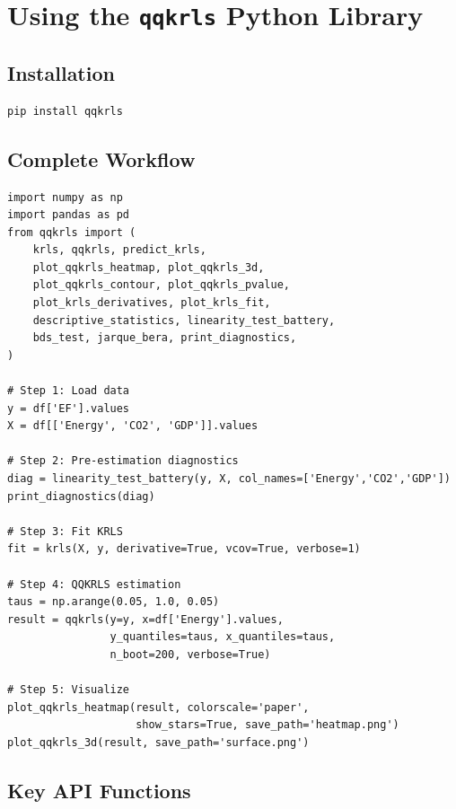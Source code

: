 \section{Using the \texttt{qqkrls} Python Library}

\subsection{Installation}

\begin{lstlisting}[language=bash,style=pythonstyle]
pip install qqkrls
\end{lstlisting}

\subsection{Complete Workflow}

\begin{lstlisting}
import numpy as np
import pandas as pd
from qqkrls import (
    krls, qqkrls, predict_krls,
    plot_qqkrls_heatmap, plot_qqkrls_3d,
    plot_qqkrls_contour, plot_qqkrls_pvalue,
    plot_krls_derivatives, plot_krls_fit,
    descriptive_statistics, linearity_test_battery,
    bds_test, jarque_bera, print_diagnostics,
)

# Step 1: Load data
y = df['EF'].values
X = df[['Energy', 'CO2', 'GDP']].values

# Step 2: Pre-estimation diagnostics
diag = linearity_test_battery(y, X, col_names=['Energy','CO2','GDP'])
print_diagnostics(diag)

# Step 3: Fit KRLS
fit = krls(X, y, derivative=True, vcov=True, verbose=1)

# Step 4: QQKRLS estimation
taus = np.arange(0.05, 1.0, 0.05)
result = qqkrls(y=y, x=df['Energy'].values,
                y_quantiles=taus, x_quantiles=taus,
                n_boot=200, verbose=True)

# Step 5: Visualize
plot_qqkrls_heatmap(result, colorscale='paper',
                    show_stars=True, save_path='heatmap.png')
plot_qqkrls_3d(result, save_path='surface.png')
\end{lstlisting}

\subsection{Key API Functions}

